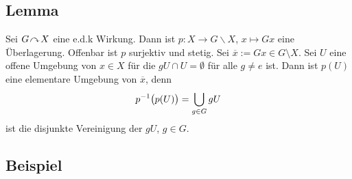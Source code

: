 \subsection[Lemma: Eigentlich diskontinuierliche Wirkungen definieren Überlagerungen]{Lemma} %
\label{sub:12.2}
Sei $G \wirkung X$ eine e.d.k Wirkung. Dann ist $p : X \to G \backslash X$, $x \mapsto Gx$ eine Überlagerung.
Offenbar ist $p$ surjektiv und stetig. Sei $\overline{x} := G x \in G \setminus X $. Sei $U$ eine offene Umgebung von $x \in X$ für die $g U \cap U = \emptyset$ für alle $g \not= e$ ist. Dann ist $p(U)$ eine elementare Umgebung von $\overline{x}$, denn 
\[
	p ^{-1} \enbrace[\big]{p(U)} = \bigcup_{g \in G} g U
\]
ist die disjunkte Vereinigung der $g U$, $g \in G$. \bewende

\subsection[Beispiele für edk-Wirkungen]{Beispiel} %
\label{sub:12.3}
